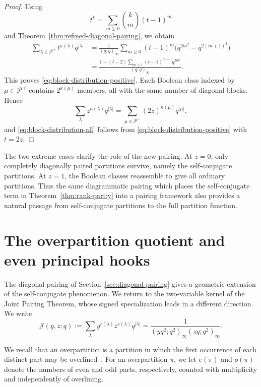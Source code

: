 \documentclass[11pt]{article}
\theoremstyle{definition}
\theoremstyle{remark}
\begin{document}
\begin{proof}
Using
\[
 t^k=\sum_{m\geq0}\binom{k}{m}(t-1)^m
\]
and Theorem~\ref{thm:refined-diagonal-pairing}, we obtain
\begin{align*}
 \sum_{\lambda\in\mathcal P^+}t^{\kappa(\lambda)}q^{|\lambda|}
 &=\frac{1}{(q;q)_\infty}
 \sum_{m\geq0}(t-1)^m
 \bigl(q^{2m^2}-q^{2(m+1)^2}\bigr)\\
 &=\frac{1+(t-2)\displaystyle\sum_{m\geq1}(t-1)^{m-1}q^{2m^2}}
 {(q;q)_\infty}.
\end{align*}
This proves \eqref{eq:block-distribution-positive}.  Each Boolean class indexed by $\mu\in\mathcal P^+$ contains $2^{\kappa(\mu)}$ members, all with the same number of diagonal blocks.  Hence
\[
 \sum_{\lambda}z^{\kappa(\lambda)}q^{|\lambda|}
 =\sum_{\mu\in\mathcal P^+}(2z)^{\kappa(\mu)}q^{|\mu|},
\]
and \eqref{eq:block-distribution-all} follows from \eqref{eq:block-distribution-positive} with $t=2z$.
\end{proof}

The two extreme cases clarify the role of the new pairing.  At $z=0$, only completely diagonally paired partitions survive, namely the self-conjugate partitions.  At $z=1$, the Boolean classes reassemble to give all ordinary partitions.  Thus the same diagrammatic pairing which places the self-conjugate term in Theorem~\ref{thm:rank-parity} into a pairing framework also provides a natural passage from self-conjugate partitions to the full partition function.

\section{The overpartition quotient and even principal hooks}\label{sec:overpartition-quotient}

The diagonal pairing of Section~\ref{sec:diagonal-pairing} gives a geometric extension of the self-conjugate phenomenon.  We return to the two-variable kernel of the Joint Pairing Theorem, whose signed specialization leads in a different direction.  We write
\begin{equation}\label{eq:J-kernel}
 \mathcal J(y,z;q)
 :=\sum_{\lambda}y^{r(\lambda)}z^{s(\lambda)}q^{|\lambda|}
 =\frac{1}{(yq^2;q^2)_\infty(zq;q^2)_\infty}.
\end{equation}


We recall that an overpartition is a partition in which the first occurrence of each distinct part may be overlined~\cite{CorteelLovejoy2004}.  For an overpartition $\pi$, we let $e(\pi)$ and $o(\pi)$ denote the numbers of even and odd parts, respectively, counted with multiplicity and independently of overlining.
\end{document}
